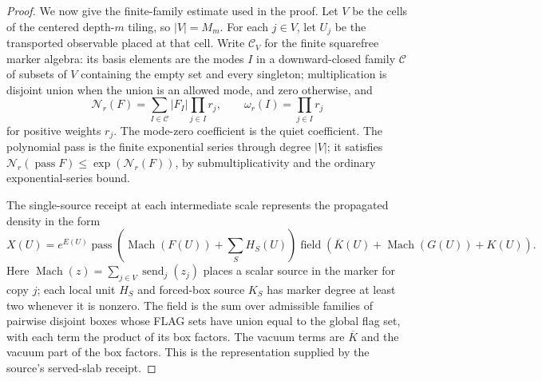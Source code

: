 \begin{proof}
We now give the finite-family estimate used in the proof. Let $V$ be the cells of the centered depth-$m$ tiling, so $|V|=M_m$. For each $j\in V$, let $U_j$ be the transported observable placed at that cell. Write $\mathcal C_V$ for the finite squarefree marker algebra: its basis elements are the modes $I$ in a downward-closed family $\mathcal C$ of subsets of $V$ containing the empty set and every singleton; multiplication is disjoint union when the union is an allowed mode, and zero otherwise, and
\[
 \mathcal N_r(F)=\sum_{I\in\mathcal C}|F_I|\prod_{j\in I}r_j,
 \qquad \omega_r(I)=\prod_{j\in I}r_j
\]
for positive weights $r_j$. The mode-zero coefficient is the quiet coefficient. The polynomial pass is the finite exponential series through degree $|V|$; it satisfies $\mathcal N_r(\operatorname{pass}F)\leq\exp(\mathcal N_r(F))$, by submultiplicativity and the ordinary exponential-series bound.

The single-source receipt at each intermediate scale represents the propagated density in the form
\[
 X(U)=e^{E(U)}\operatorname{pass}\!\left(\operatorname{Mach}(F(U))+\sum_{S}H_S(U)\right)
 \operatorname{field}\!\left(\overline K(U)+\operatorname{Mach}(G(U))+K(U)\right).
\]
Here $\operatorname{Mach}(z)=\sum_{j\in V}\operatorname{send}_j(z_j)$ places a scalar source in the marker for copy $j$; each local unit $H_S$ and forced-box source $K_S$ has marker degree at least two whenever it is nonzero. The field is the sum over admissible families of pairwise disjoint boxes whose FLAG sets have union equal to the global flag set, with each term the product of its box factors. The vacuum terms are $\overline K$ and the vacuum part of the box factors. This is the representation supplied by the source's served-slab receipt.


\end{proof}
